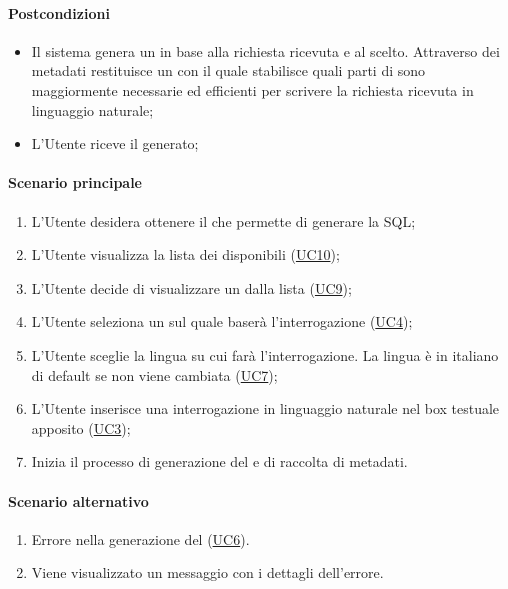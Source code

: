 \paragraph*{Postcondizioni}
\begin{itemize}
  \item Il sistema genera un  in base alla richiesta ricevuta e al  scelto. Attraverso dei metadati restituisce un  con il quale stabilisce quali parti di  sono maggiormente necessarie ed efficienti per scrivere la richiesta ricevuta in linguaggio naturale;
  \item L’Utente riceve il  generato;
\end{itemize}

\paragraph*{Scenario principale}
\begin{enumerate}
  \item L’Utente desidera ottenere il  che permette di generare la  SQL;
  \item L'Utente visualizza la lista dei  disponibili (\hyperref[UC10]{UC10});
  \item L'Utente decide di visualizzare un  dalla lista (\hyperref[UC9]{UC9});
  \item L’Utente seleziona un  sul quale baserà l’interrogazione (\hyperref[UC4]{UC4});
  \item L’Utente sceglie la lingua su cui farà l’interrogazione. La lingua è in italiano di default se non viene cambiata (\hyperref[UC7]{UC7});
  \item L’Utente inserisce una interrogazione in linguaggio naturale nel box testuale apposito (\hyperref[UC3]{UC3});
  \item Inizia il processo di generazione del  e di raccolta di metadati.
\end{enumerate}

\paragraph*{Scenario alternativo}
\begin{enumerate}
  \item Errore nella generazione del  (\hyperref[UC6]{UC6}).
  \item Viene visualizzato un messaggio con i dettagli dell'errore.
\end{enumerate}

